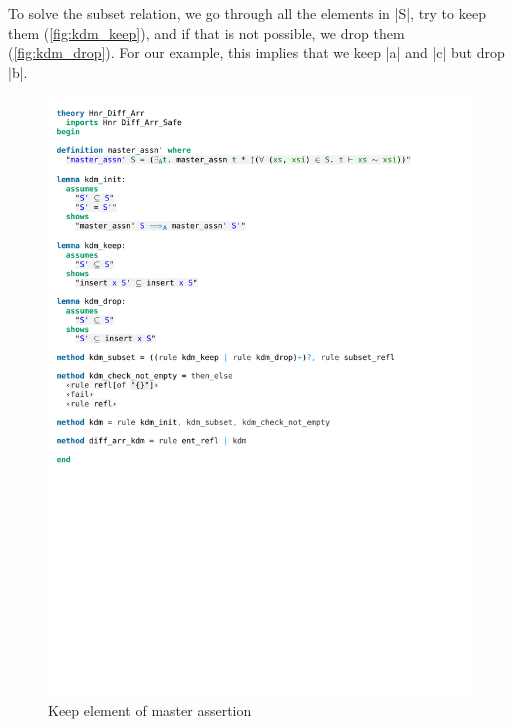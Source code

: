 \noindent To solve the subset relation, we go through all the elements in |S|, try to keep them (\autoref{fig:kdm_keep}), and if that is not possible, we drop them (\autoref{fig:kdm_drop}). For our example, this implies that we keep |a| and |c| but drop |b|.

\begin{figure}[htpb]
    \includegraphics[trim={0 20,2cm 0 7,2cm}, clip, width=1.00\textwidth]{figures/Theory_Hnr_Diff_Arr_KDM.pdf}
    \caption[Keep element of master assertion]{Keep element of master assertion}
    \label{fig:kdm_keep}
\end{figure}

